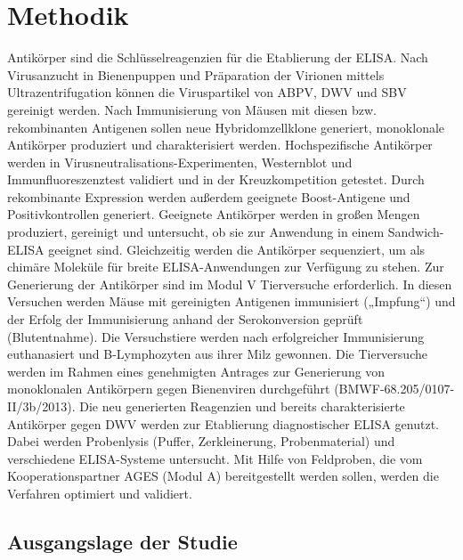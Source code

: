 \section{Methodik}

Antikörper sind die Schlüsselreagenzien für die Etablierung der ELISA. Nach Virusanzucht in Bienenpuppen und Präparation der Virionen mittels Ultrazentrifugation können die Viruspartikel von ABPV, DWV und SBV gereinigt werden. Nach Immunisierung von Mäusen mit diesen bzw. rekombinanten Antigenen sollen neue Hybridomzellklone generiert, monoklonale Antikörper produziert und charakterisiert werden. Hochspezifische Antikörper werden in Virusneutralisations-Experimenten, Westernblot und Immunfluoreszenztest validiert und in der Kreuzkompetition getestet. Durch rekombinante Expression werden außerdem geeignete Boost-Antigene und Positivkontrollen generiert. Geeignete Antikörper werden in großen Mengen produziert, gereinigt und untersucht, ob sie zur Anwendung in einem Sandwich-ELISA geeignet sind. Gleichzeitig werden die Antikörper sequenziert, um als chimäre Moleküle für breite ELISA-Anwendungen zur Verfügung zu stehen. Zur Generierung der Antikörper sind im Modul V Tierversuche erforderlich. In diesen Versuchen werden Mäuse mit gereinigten Antigenen immunisiert („Impfung“) und der Erfolg der Immunisierung anhand der Serokonversion geprüft (Blutentnahme). Die Versuchstiere werden nach erfolgreicher Immunisierung euthanasiert und B-Lymphozyten aus ihrer Milz gewonnen. Die Tierversuche werden im Rahmen eines genehmigten Antrages zur Generierung von monoklonalen Antikörpern gegen Bienenviren durchgeführt (BMWF-68.205/0107-II/3b/2013). Die neu generierten Reagenzien und bereits charakterisierte Antikörper gegen DWV werden zur Etablierung diagnostischer ELISA genutzt. Dabei werden Probenlysis (Puffer, Zerkleinerung, Probenmaterial) und verschiedene ELISA-Systeme untersucht. Mit Hilfe von Feldproben, die vom Kooperationspartner AGES (Modul A) bereitgestellt werden sollen, werden die Verfahren optimiert und validiert.

\subsection{Ausgangslage der Studie}

